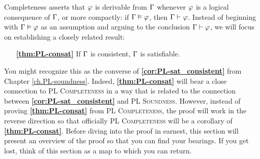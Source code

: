 

Completeness asserts that $\varphi$ is derivable from $\Gamma$ whenever $\varphi$ is a logical consequence of $\Gamma$, or more compactly: if $\Gamma\vDash\varphi$, then $\Gamma\vdash\varphi$.
Instead of beginning with $\Gamma\vDash\varphi$ as an assumption and arguing to the conclusion $\Gamma\vdash\varphi$, we will focus on establishing a closely related result: 
\begin{enumerate}[leftmargin=1.5in]
  \item[\textbf{\ref{thm:PL-consat}}] If $\Gamma$ is consistent, $\Gamma$ is satisfiable. 
\end{enumerate}
You might recognize this as the converse of \textbf{\ref{cor:PL-sat_consistent}} from Chapter \ref{ch.PL-soundness}.
Indeed, \textbf{\ref{thm:PL-consat}} will bear a close connection to \textsc{PL Completeness} in a way that is related to the connection between \textbf{\ref{cor:PL-sat_consistent}} and \textsc{PL Soundness}.
However, instead of proving \textbf{\ref{thm:PL-consat}} from \textsc{PL Completeness}, the proof will work in the reverse direction so that officially \textsc{PL Completeness} will be a corollary of \textbf{\ref{thm:PL-consat}}.
Before diving into the proof in earnest, this section will present an overview of the proof so that you can find your bearings.
If you get lost, think of this section as a map to which you can return.

